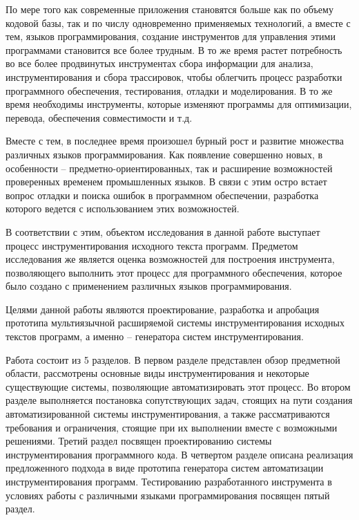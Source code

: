 \intro

По мере того как современные приложения становятся больше как по объему кодовой базы, так и по числу одновременно применяемых технологий, а вместе с тем, языков программирования, создание инструментов для управления этими программами становится все более трудным.
В то же время растет потребность во все более продвинутых инструментах сбора информации для анализа, инструментирования и сбора трассировок, чтобы облегчить процесс разработки программного обеспечения, тестирования, отладки и моделирования.
В то же время необходимы инструменты, которые изменяют программы для оптимизации, перевода, обеспечения совместимости и т.д.

Вместе с тем, в последнее время произошел бурный рост и развитие множества различных языков программирования.
Как появление совершенно новых, в особенности -- предметно-ориентированных, так и расширение возможностей проверенных временем промышленных языков.
В связи с этим остро встает вопрос отладки и поиска ошибок в программном обеспечении, разработка которого ведется с использованием этих возможностей.

В соответствии с этим, объектом исследования в данной работе выступает процесс инструментирования исходного текста программ.
Предметом исследования же является оценка возможностей для построения инструмента, позволяющего выполнить этот процесс для программного обеспечения, которое было создано с применением различных языков программирования.

Целями данной работы являются проектирование, разработка и апробация прототипа мультиязычной расширяемой системы инструментирования исходных текстов программ, а именно -- генератора систем инструментирования.

Работа состоит из 5 разделов.
В первом разделе представлен обзор предметной области, рассмотрены основные виды инструментирования и некоторые существующие системы, позволяющие автоматизировать этот процесс.
Во втором разделе выполняется постановка сопутствующих задач, стоящих на пути создания автоматизированной системы инструментирования, а также рассматриваются требования и ограничения, стоящие при их выполнении вместе с возможными решениями.
Третий раздел посвящен проектированию системы инструментирования программного кода.
В четвертом разделе описана реализация предложенного подхода в виде прототипа генератора систем автоматизации инструментирования программ.
Тестированию разработанного инструмента в условиях работы с различными языками программирования посвящен пятый раздел.
